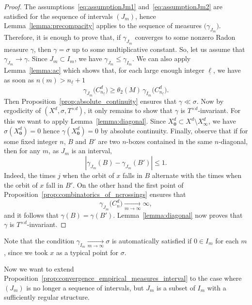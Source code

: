\documentclass[AHL,Unicode,longabstracts]{cedram}
\newcommand{\tend}[3][]{\xrightarrow[#2\to#3]{#1}}
\newcommand{\cd}{C^{d}}
\newcommand{\td}{T^{\times d}}
\newcommand{\bz}{\boldsymbol{0}}
\newcommand{\lb}{\underline{\ell}}
\newcommand{\Gam}[1]{\gamma_{#1}\bigl(\cd_{n_{\lb}}\bigr)}
\begin{document}
\begin{proof}
The assumptions~\eqref{eq:assumptionJm1} and~\eqref{eq:assumptionJm2} are satisfied for the sequence of intervals $(J_m)$, hence Lemma~\ref{lemma:precompacity} applies to the sequence of measures $\big(\gamma_{J_m}\bigr)$. Therefore, it is enough to prove that, if $\gamma_{J_m}$ converges to some nonzero Radon measure $\gamma$, then $\gamma=\sigma$ up to some multiplicative constant. So, let us assume that $\gamma_{J_m}\to\gamma$. Since $J_m\subset I_m$, we have $\gamma_{J_m}\le \gamma_{I_m}$. We can also apply Lemma~\ref{lemma:ac} which shows that, for each large enough integer $\lb$, we have as soon as $n(m)>n_{\lb}+1$
\[
\Gam{J_m}\ge \theta_2(M)\, \Gam{I_m}.
\]
Then Proposition~\ref{prop:absolute_continuity} ensures that $\gamma\ll\sigma$. Now by ergodicity of $(X^d,\sigma,\td)$, it only remains to show that $\gamma$ is $\td$-invariant. For this we want to apply Lemma~\ref{lemma:diagonal}. Since $X_{\bz}^d\subset X^d\setminus X_\infty^d$, we have $\sigma(X_{\bz}^d)=0$ hence $\gamma(X_{\bz}^d)=0$ by absolute continuity. Finally, observe that if for some fixed integer $n$, $B$ and $B'$ are two $n$-boxes contained in the same $n$-diagonal, then for any $m$, as $J_m$ is an interval,
\[
\left| \gamma_{J_m}(B) - \gamma_{J_m}(B') \right|\le 1.
\]
Indeed, the times $j$ when the orbit of $x$ falls in $B$ alternate with the times when the orbit of $x$ fall in $B'$. On the other hand the first point of Proposition~\ref{prop:combinatorics_of_ncrossings} ensures that
\[
\gamma_{J_m}\bigl(\cd_n\bigr)\tend{m}{\infty}\infty,
\]
and it follows that $\gamma(B)=\gamma(B')$. Lemma~\ref{lemma:diagonal} now proves that $\gamma$ is $\td$-invariant.
\end{proof}

\begin{rema}
Note that the condition $\gamma_{I_m}\tend{m}{\infty}\sigma$ is automatically satisfied if $0\in I_m$ for each $m$, since we took $x$ as a typical point for $\sigma$.
\end{rema}

Now we want to extend Proposition~\ref{prop:convergence_empirical_measures_interval} to the case where $(J_m)$ is no longer a sequence of intervals, but $J_m$ is a subset of $I_m$ with a sufficiently regular structure.
\end{document}
